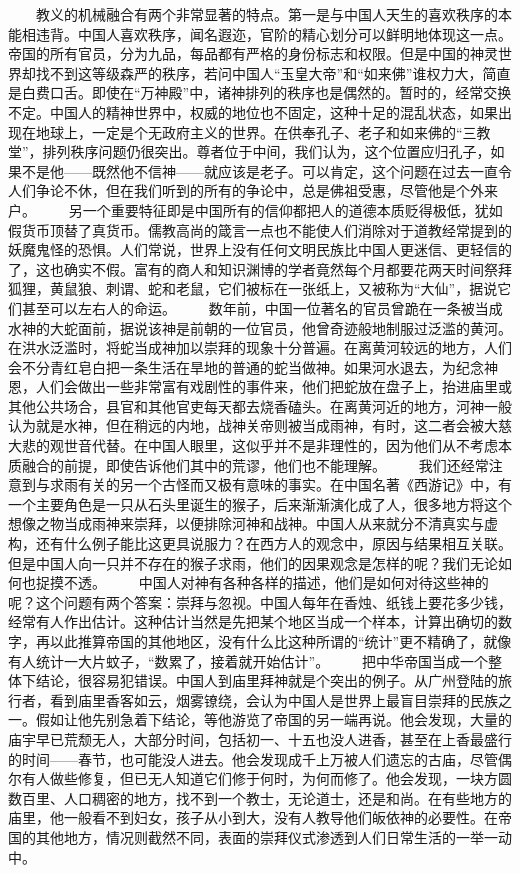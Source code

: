 \documentclass[12pt,oneside]{book}
\begin{document}
\begin{common-format}
　　教义的机械融合有两个非常显著的特点。第一是与中国人天生的喜欢秩序的本能相违背。中国人喜欢秩序，闻名遐迩，官阶的精心划分可以鲜明地体现这一点。帝国的所有官员，分为九品，每品都有严格的身份标志和权限。但是中国的神灵世界却找不到这等级森严的秩序，若问中国人“玉皇大帝”和“如来佛”谁权力大，简直是白费口舌。即使在“万神殿”中，诸神排列的秩序也是偶然的。暂时的，经常交换不定。中国人的精神世界中，权威的地位也不固定，这种十足的混乱状态，如果出现在地球上，一定是个无政府主义的世界。在供奉孔子、老子和如来佛的“三教堂”，排列秩序问题仍很突出。尊者位于中间，我们认为，这个位置应归孔子，如果不是他——既然他不信神——就应该是老子。可以肯定，这个问题在过去一直令人们争论不休，但在我们听到的所有的争论中，总是佛祖受惠，尽管他是个外来户。 
　　另一个重要特征即是中国所有的信仰都把人的道德本质贬得极低，犹如假货币顶替了真货币。儒教高尚的箴言一点也不能使人们消除对于道教经常提到的妖魔鬼怪的恐惧。人们常说，世界上没有任何文明民族比中国人更迷信、更轻信的了，这也确实不假。富有的商人和知识渊博的学者竟然每个月都要花两天时间祭拜狐狸，黄鼠狼、刺谓、蛇和老鼠，它们被标在一张纸上，又被称为“大仙”，据说它们甚至可以左右人的命运。 
　　数年前，中国一位著名的官员曾跪在一条被当成水神的大蛇面前，据说该神是前朝的一位官员，他曾奇迹般地制服过泛滥的黄河。在洪水泛滥时，将蛇当成神加以崇拜的现象十分普遍。在离黄河较远的地方，人们会不分青红皂白把一条生活在旱地的普通的蛇当做神。如果河水退去，为纪念神恩，人们会做出一些非常富有戏剧性的事件来，他们把蛇放在盘子上，抬进庙里或其他公共场合，县官和其他官吏每天都去烧香磕头。在离黄河近的地方，河神一般认为就是水神，但在稍远的内地，战神关帝则被当成雨神，有时，这二者会被大慈大悲的观世音代替。在中国人眼里，这似乎并不是非理性的，因为他们从不考虑本质融合的前提，即使告诉他们其中的荒谬，他们也不能理解。 
　　我们还经常注意到与求雨有关的另一个古怪而又极有意味的事实。在中国名著《西游记》中，有一个主要角色是一只从石头里诞生的猴子，后来渐渐演化成了人，很多地方将这个想像之物当成雨神来崇拜，以便排除河神和战神。中国人从来就分不清真实与虚构，还有什么例子能比这更具说服力？在西方人的观念中，原因与结果相互关联。但是中国人向一只并不存在的猴子求雨，他们的因果观念是怎样的呢？我们无论如何也捉摸不透。 
　　中国人对神有各种各样的描述，他们是如何对待这些神的呢？这个问题有两个答案：崇拜与忽视。中国人每年在香烛、纸钱上要花多少钱，经常有人作出估计。这种估计当然是先把某个地区当成一个样本，计算出确切的数字，再以此推算帝国的其他地区，没有什么比这种所谓的“统计”更不精确了，就像有人统计一大片蚊子，“数累了，接着就开始估计”。 
　　把中华帝国当成一个整体下结论，很容易犯错误。中国人到庙里拜神就是个突出的例子。从广州登陆的旅行者，看到庙里香客如云，烟雾镣绕，会认为中国人是世界上最盲目崇拜的民族之一。假如让他先别急着下结论，等他游览了帝国的另一端再说。他会发现，大量的庙宇早已荒颓无人，大部分时间，包括初一、十五也没人进香，甚至在上香最盛行的时间——春节，也可能没人进去。他会发现成千上万被人们遗忘的古庙，尽管偶尔有人做些修复，但已无人知道它们修于何时，为何而修了。他会发现，一块方圆数百里、人口稠密的地方，找不到一个教士，无论道士，还是和尚。在有些地方的庙里，他一般看不到妇女，孩子从小到大，没有人教导他们皈依神的必要性。在帝国的其他地方，情况则截然不同，表面的崇拜仪式渗透到人们日常生活的一举一动中。 

\end{common-format}
\end{document}
